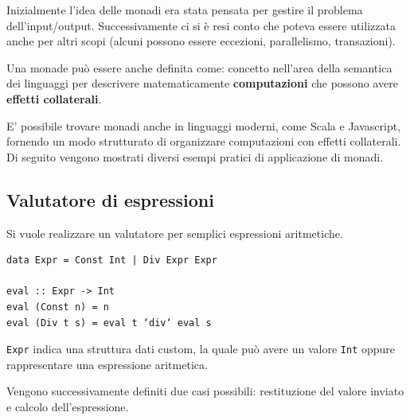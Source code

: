 \documentclass{article}
\begin{document}
Inizialmente l'idea delle monadi era stata pensata per gestire il problema dell'input/output. Successivamente ci si è resi conto che poteva essere utilizzata anche per altri scopi (alcuni possono essere eccezioni, parallelismo, transazioni).

Una monade può essere anche definita come: concetto nell’area della semantica dei linguaggi per descrivere matematicamente \textbf{computazioni} che possono avere \textbf{effetti collaterali}.

E' possibile trovare monadi anche in linguaggi moderni, come Scala e Javascript, fornendo un modo strutturato di organizzare computazioni con effetti collaterali.\vspace{14pt}\\
Di seguito vengono mostrati diversi esempi pratici di applicazione di monadi.

\pagebreak

\subsection*{Valutatore di espressioni}
Si vuole realizzare un valutatore per semplici espressioni aritmetiche.
\begin{tcolorbox}
\begin{verbatim}
data Expr = Const Int | Div Expr Expr

eval :: Expr -> Int
eval (Const n) = n
eval (Div t s) = eval t ‘div‘ eval s
\end{verbatim}
\end{tcolorbox}
\texttt{Expr} indica una struttura dati custom, la quale può avere un valore \texttt{Int} oppure rappresentare una espressione aritmetica.

Vengono successivamente definiti due casi possibili: restituzione del valore inviato e calcolo dell'espressione.
\end{document}
